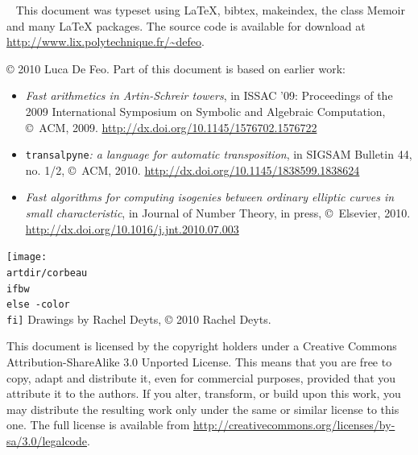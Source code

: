 \begin{titlingpage}
  \clearpage

  ~\vfill
  \footnotesize
  This document was typeset using \LaTeX{}, bibtex, makeindex, the
  class Memoir and many \LaTeX{} packages. The source code is
  available for download at
  \url{http://www.lix.polytechnique.fr/~defeo}.

  \bigskip

  \copyright{} 2010 Luca De Feo.  Part of this document is based on
  earlier work:
  \begin{itemize}
  \item \textit{Fast arithmetics in Artin-Schreir towers}, in ISSAC
    '09: Proceedings of the 2009 International Symposium on Symbolic
    and Algebraic Computation, \copyright{}~ACM,
    2009. \url{http://dx.doi.org/10.1145/1576702.1576722}
  \item \texttt{transalpyne}\textit{: a language for automatic
      transposition}, in SIGSAM Bulletin 44, no. 1/2,
    \copyright{}~ACM,
    2010. \url{http://dx.doi.org/10.1145/1838599.1838624}
  \item \textit{Fast algorithms for computing isogenies between
      ordinary elliptic curves in small characteristic}, in Journal of
    Number Theory, in press, \copyright{}~Elsevier,
    2010. \url{http://dx.doi.org/10.1016/j.jnt.2010.07.003}
  \end{itemize}

  \bigskip

  \ifartwork 
  \texttt{[image: \\artdir/corbeau\\ifbw\\else -color\\fi]}
  Drawings by Rachel Deyts, \copyright{} 2010 Rachel Deyts.
  \bigskip\fi

  \href{http://creativecommons.org/licenses/by-sa/3.0}{}
  This document is licensed by the copyright holder\ifartwork s\fi{}
  under a Creative Commons Attribution-ShareAlike 3.0 Unported
  License. This means that you are free to copy, adapt and distribute
  it, even for commercial purposes, provided that you attribute it to
  the author\ifartwork s\fi.  If you alter, transform, or build upon
  this work, you may distribute the resulting work only under the same
  or similar license to this one.  The full license is available from
  \url{http://creativecommons.org/licenses/by-sa/3.0/legalcode}.
\end{titlingpage}

